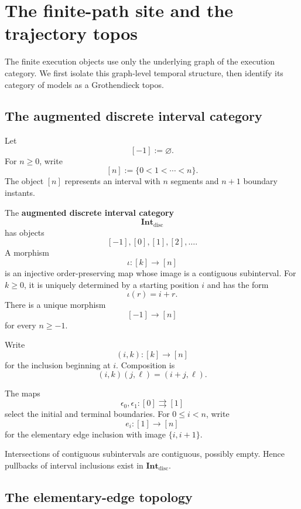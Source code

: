 \section{The finite-path site and the trajectory topos}
\label{sec:finite-path-site-trajectory-topos}

The finite execution objects use only the underlying graph of the execution
category. We first isolate this graph-level temporal structure, then identify
its category of models as a Grothendieck topos.

\subsection{The augmented discrete interval category}
\label{subsec:augmented-discrete-interval-category}

Let
\[
    [-1]:=\varnothing.
\]
For \(n\geq0\), write
\[
    [n]:=\{0<1<\cdots<n\}.
\]
The object \([n]\) represents an interval with \(n\) segments and
\(n+1\) boundary instants.

\begin{definition}
\label{def:augmented-discrete-interval-category}
The \textbf{augmented discrete interval category}
\[
    \mathbf{Int}_{\mathrm{disc}}
\]
has objects
\[
    [-1],[0],[1],[2],\ldots.
\]
A morphism
\[
    \iota:[k]\longrightarrow[n]
\]
is an injective order-preserving map whose image is a contiguous
subinterval. For \(k\geq0\), it is uniquely determined by a starting
position \(i\) and has the form
\[
    \iota(r)=i+r.
\]
There is a unique morphism
\[
    [-1]\to[n]
\]
for every \(n\geq-1\).
\end{definition}

Write
\[
    (i,k):[k]\to[n]
\]
for the inclusion beginning at \(i\). Composition is
\[
    (i,k)(j,\ell)=(i+j,\ell).
\]

The maps
\[
    \epsilon_0,\epsilon_1:[0]\rightrightarrows[1]
\]
select the initial and terminal boundaries. For \(0\leq i<n\), write
\[
    e_i:[1]\to[n]
\]
for the elementary edge inclusion with image \(\{i,i+1\}\).

Intersections of contiguous subintervals are contiguous, possibly empty.
Hence pullbacks of interval inclusions exist in
\(\mathbf{Int}_{\mathrm{disc}}\).

\subsection{The elementary-edge topology}
\label{subsec:elementary-edge-topology}

